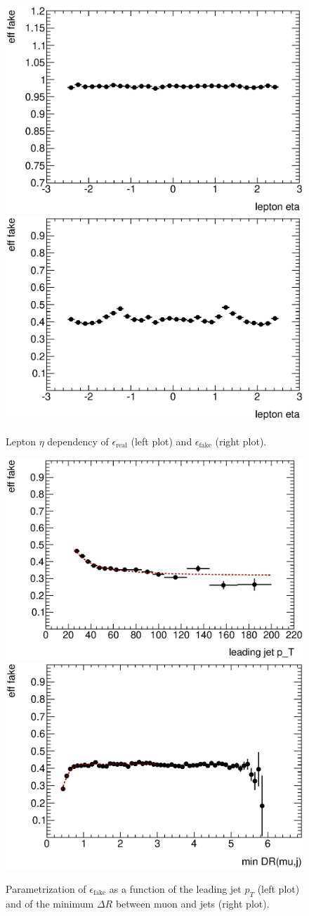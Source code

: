 \begin{figure}\centering
\includegraphics[width=.45\textwidth]{appendices/figures/mujets_mmB/fit_h_lep_eta_muon_real_untagged}\includegraphics[width=.45\textwidth]{appendices/figures/mujets_mmB/fit_h_lep_eta_muon_fake_untagged}
\caption{Lepton $\eta$ dependency of $\epsilon_\mathrm{real}$ (left plot) and $\epsilon_\mathrm{fake}$ (right plot).}\label{fig:etaDep}
\end{figure} \begin{figure}\centering
\includegraphics[width=.45\textwidth]{appendices/figures/mujets_mmB/fit_h_lep_LJpT_rb_muon_fake_untagged}\includegraphics[width=.45\textwidth]{appendices/figures/mujets_mmB/fit_h_lep_minDR_muon_fake_untagged}
\caption{Parametrization of $\epsilon_\mathrm{fake}$ as a function of the leading jet $p_T$ (left plot) and of the minimum $\Delta R$ between muon and jets (right plot). }\label{fig:ljptmindrDep}
\end{figure} 

